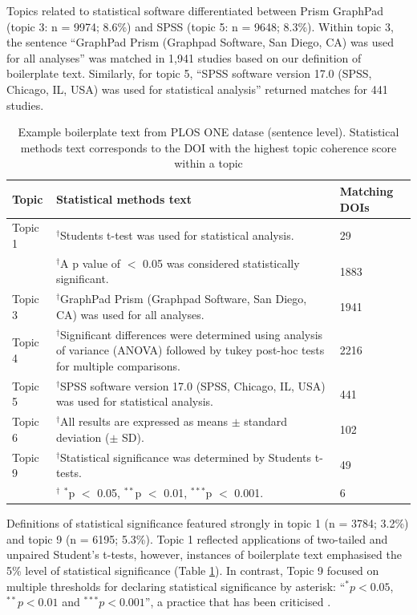 \documentclass[12pt]{article}
\begin{document}
Topics related to statistical software differentiated between Prism
GraphPad (topic 3: n = 9974; 8.6\%) and SPSS (topic 5: n = 9648; 8.3\%).
Within topic 3, the sentence ``GraphPad Prism (Graphpad Software, San
Diego, CA) was used for all analyses'' was matched in 1,941 studies based on our definition of boilerplate text.
Similarly, for topic 5, ``SPSS software version
17.0 (SPSS, Chicago, IL, USA) was used for statistical analysis'' returned matches for 441 studies.

\begin{landscape}
\begin{table}

\caption{\label{tab:plos-example-boilerplate}Example boilerplate text from PLOS ONE datase (sentence level). Statistical methods text corresponds to the DOI with the highest topic coherence score within a topic}
\centering
\begin{tabular}[t]{p{}p{}p{}}
\hline
Topic & Statistical methods text & Matching DOIs\\
\hline
Topic 1 & $^{\dagger}$Students t-test was used for statistical analysis. & 29\\
\cline{2-3}
 & $^{\dagger}$A p value of $<$ 0.05 was considered statistically significant. & 1883\\
\hline
Topic 3 & $^{\dagger}$GraphPad Prism (Graphpad Software, San Diego, CA) was used for all analyses. & 1941\\
\hline
Topic 4 & $^{\dagger}$Significant differences were determined using analysis of variance (ANOVA) followed by tukey post-hoc tests for multiple comparisons. & 2216\\
\hline
Topic 5 & $^{\dagger}$SPSS software version 17.0 (SPSS, Chicago, IL, USA) was used for statistical analysis. & 441\\
\hline
Topic 6 & $^{\dagger}$All results are expressed as means $\pm$ standard deviation ($\pm$ SD). & 102\\
\hline
Topic 9 & $^{\dagger}$Statistical significance was determined by Students t-tests. & 49\\
\cline{2-3}
& $^{\dagger}$ $^*$p $<$ 0.05, $^{**}$p $<$ 0.01, $^{***}$p $<$ 0.001. & 6\\
\hline
\end{tabular}
\end{table}
\end{landscape}


Definitions of statistical significance featured strongly in topic 1 (n
= 3784; 3.2\%) and topic 9 (n = 6195; 5.3\%). Topic 1 reflected
applications of two-tailed and unpaired Student's t-tests, however,
instances of boilerplate text emphasised the 5\% level of statistical
significance (Table \ref{tab:plos-example-boilerplate}). In contrast, Topic 9
focused on multiple thresholds for declaring statistical significance by
asterisk: ``\(^{*}p<0.05\), \(^{**}p<0.01\) and \(^{***}p<0.001\)'', a
practice that has been criticised \citep{Wasserstein2019}.
\end{document}
